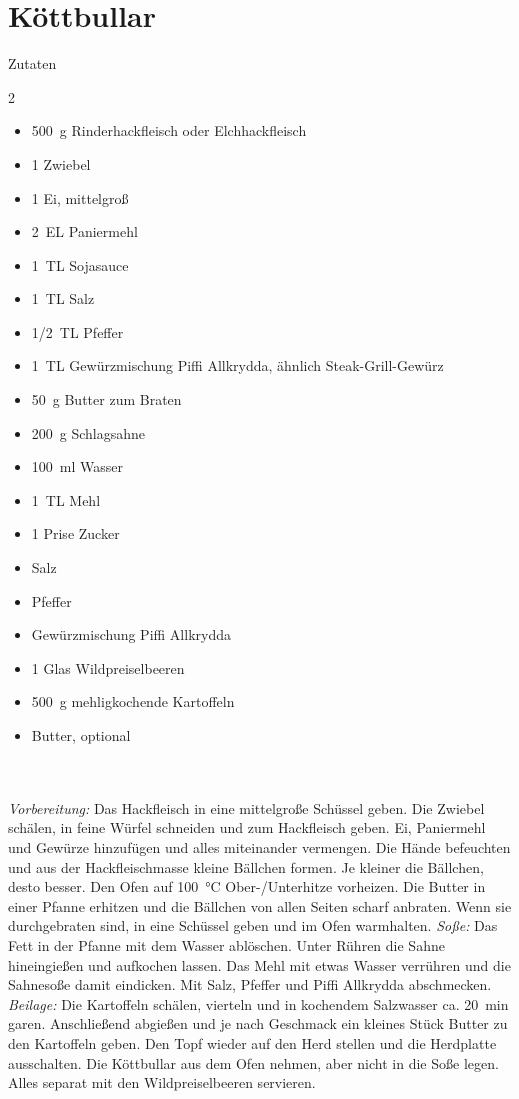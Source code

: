\section*{Köttbullar}
\ihead{}\ohead{}
\cfoot{}
{\Large Zutaten}
\begin{multicols}{2}
\begin{itemize}
\item \SI{500}{g} Rinderhackfleisch oder Elchhackfleisch
\item \num{1} Zwiebel
\item \num{1} Ei, mittelgroß
\item \SI{2}{EL} Paniermehl
\item \SI{1}{TL} Sojasauce
\item \SI{1}{TL} Salz
\item \SI{1/2}{TL} Pfeffer
\item \SI{1}{TL} Gewürzmischung Piffi Allkrydda, ähnlich Steak-Grill-Gewürz
\item \SI{50}{g} Butter zum Braten
\item \SI{200}{g} Schlagsahne
\item \SI{100}{ml} Wasser
\item \SI{1}{TL} Mehl
\item \num{1} Prise Zucker
\item Salz
\item Pfeffer
\item Gewürzmischung Piffi Allkrydda
\item \num{1} Glas Wildpreiselbeeren
\item \SI{500}{g} mehligkochende Kartoffeln
\item Butter, optional
\end{itemize}
\end{multicols}
\\
\\
\textit{Vorbereitung:} Das Hackfleisch in eine mittelgroße Schüssel geben.
Die Zwiebel schälen, in feine Würfel schneiden und zum Hackfleisch geben.
Ei, Paniermehl und Gewürze hinzufügen und alles miteinander vermengen.
Die Hände befeuchten und aus der Hackfleischmasse kleine Bällchen formen.
Je kleiner die Bällchen, desto besser.
Den Ofen auf \SI{100}{\celsius} Ober-/Unterhitze vorheizen.
Die Butter in einer Pfanne erhitzen und die Bällchen von allen Seiten scharf anbraten.
Wenn sie durchgebraten sind, in eine Schüssel geben und im Ofen warmhalten.
\textit{Soße:} Das Fett in der Pfanne mit dem Wasser ablöschen.
Unter Rühren die Sahne hineingießen und aufkochen lassen.
Das Mehl mit etwas Wasser verrühren und die Sahnesoße damit eindicken.
Mit Salz, Pfeffer und Piffi Allkrydda abschmecken.
\textit{Beilage:} Die Kartoffeln schälen, vierteln und in kochendem Salzwasser ca. \SI{20}{min} garen.
Anschließend abgießen und je nach Geschmack ein kleines Stück Butter zu den Kartoffeln geben.
Den Topf wieder auf den Herd stellen und die Herdplatte ausschalten.
Die Köttbullar aus dem Ofen nehmen, aber nicht in die Soße legen.
Alles separat mit den Wildpreiselbeeren servieren.
